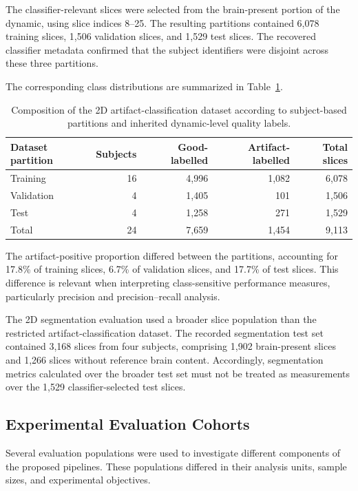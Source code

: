 The classifier-relevant slices were selected from the brain-present portion of the dynamic, using slice indices 8--25. The resulting partitions contained 6,078 training slices, 1,506 validation slices, and 1,529 test slices. The recovered classifier metadata confirmed that the subject identifiers were disjoint across these three partitions.

The corresponding class distributions are summarized in Table~\ref{tab:2d_classification_splits}.

\begin{table}[htbp]
\centering
\caption{Composition of the 2D artifact-classification dataset according to subject-based partitions and inherited dynamic-level quality labels.}
\label{tab:2d_classification_splits}
\begin{tabular}{lrrrr}
\hline
Dataset partition & Subjects & Good-labelled & Artifact-labelled & Total slices \\
\hline
Training & 16 & 4,996 & 1,082 & 6,078 \\
Validation & 4 & 1,405 & 101 & 1,506 \\
Test & 4 & 1,258 & 271 & 1,529 \\
\hline
Total & 24 & 7,659 & 1,454 & 9,113 \\
\hline
\end{tabular}
\end{table}

The artifact-positive proportion differed between the partitions, accounting for 17.8\% of training slices, 6.7\% of validation slices, and 17.7\% of test slices. This difference is relevant when interpreting class-sensitive performance measures, particularly precision and precision--recall analysis.

The 2D segmentation evaluation used a broader slice population than the restricted artifact-classification dataset. The recorded segmentation test set contained 3,168 slices from four subjects, comprising 1,902 brain-present slices and 1,266 slices without reference brain content. Accordingly, segmentation metrics calculated over the broader test set must not be treated as measurements over the 1,529 classifier-selected test slices.

\subsection{Experimental Evaluation Cohorts}
\label{subsec:results_evaluation_cohorts}

Several evaluation populations were used to investigate different components of the proposed pipelines. These populations differed in their analysis units, sample sizes, and experimental objectives.

